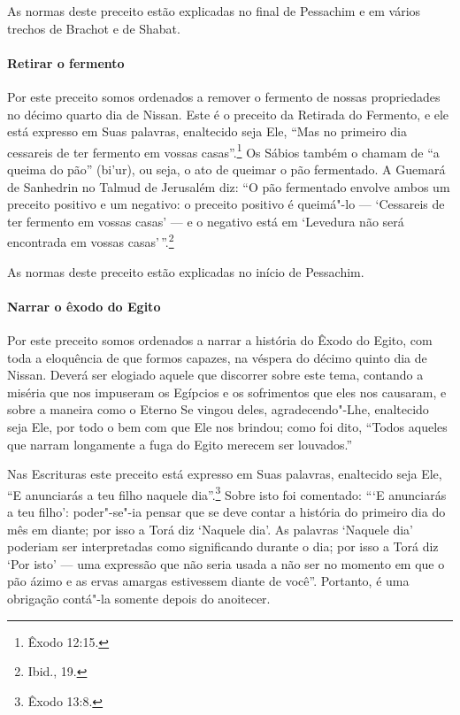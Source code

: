 \begin{multicols}{2}
As normas deste preceito estão explicadas no final de Pessachim\starr{} e em
vários trechos de Brachot\starr{} e de Shabat.

\paragraph{Retirar o fermento}

Por este preceito somos ordenados a remover o fermento de nossas
propriedades no décimo quarto dia de Nissan\starr. Este é o preceito da
Retirada do Fermento, e ele está expresso em Suas palavras, enaltecido seja Ele,
``Mas no primeiro dia cessareis de ter fermento em vossas casas''.\footnote{Êxodo 12:15.}
Os Sábios também o chamam de ``a queima do pão'' (bi'ur), ou seja, o ato
de queimar o pão fermentado. A Guemará\starr{} de Sanhedrin\starr{} no Talmud\starr{} de
Jerusalém diz: ``O pão fermentado envolve ambos um preceito positivo e um negativo: o
preceito positivo é queimá"-lo --- `Cessareis de ter fermento em vossas
casas' --- e o negativo está em `Levedura não será encontrada em vossas casas'\,''.\footnote{Ibid., 19.}

As normas deste preceito estão explicadas no início de Pessachim\starr.

\paragraph{Narrar o êxodo do Egito}

Por este preceito somos ordenados a narrar a história do Êxodo do Egito,
com toda a eloquência de que formos capazes, na véspera do décimo quinto
dia de Nissan\starr. Deverá ser elogiado aquele que discorrer sobre este tema,
contando a miséria que nos impuseram os Egípcios e os sofrimentos que
eles nos causaram, e sobre a maneira como o Eterno Se vingou deles,
agradecendo"-Lhe, enaltecido seja Ele, por todo o bem com que Ele nos
brindou; como foi dito, ``Todos aqueles que narram longamente a fuga do
Egito merecem ser louvados.''

Nas Escrituras este preceito está expresso em Suas palavras, enaltecido
seja Ele, ``E anunciarás a teu filho naquele dia''.\footnote{Êxodo 13:8.} Sobre
isto foi comentado: ```E anunciarás a teu filho': poder"-se"-ia pensar que
se deve contar a história do primeiro dia do mês em diante; por isso a
Torá\starr{} diz `Naquele dia'. As palavras `Naquele dia' poderiam ser
interpretadas como significando durante o dia; por isso a Torá\starr{} diz
`Por isto' --- uma expressão que não seria usada a não ser no momento em
que o pão ázimo e as ervas amargas estivessem diante de você''.
Portanto, é uma obrigação contá"-la somente depois do anoitecer.


\end{multicols}
